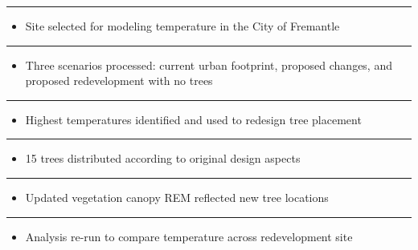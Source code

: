 \documentclass[
  letterpaper,
  DIV=11,
  numbers=noendperiod]{scrreprt}
\providecommand{\tightlist}{%
  \setlength{\itemsep}{0pt}\setlength{\parskip}{0pt}}\usepackage{longtable,booktabs,array}
\begin{document}
\begin{center}\rule{0.5\linewidth}{0.5pt}\end{center}

\begin{itemize}
\tightlist
\item
  Site selected for modeling temperature in the City of Fremantle
\end{itemize}

\begin{center}\rule{0.5\linewidth}{0.5pt}\end{center}

\begin{itemize}
\tightlist
\item
  Three scenarios processed: current urban footprint, proposed changes,
  and proposed redevelopment with no trees
\end{itemize}

\begin{center}\rule{0.5\linewidth}{0.5pt}\end{center}

\begin{itemize}
\tightlist
\item
  Highest temperatures identified and used to redesign tree placement
\end{itemize}

\begin{center}\rule{0.5\linewidth}{0.5pt}\end{center}

\begin{itemize}
\tightlist
\item
  15 trees distributed according to original design aspects
\end{itemize}

\begin{center}\rule{0.5\linewidth}{0.5pt}\end{center}

\begin{itemize}
\tightlist
\item
  Updated vegetation canopy REM reflected new tree locations
\end{itemize}

\begin{center}\rule{0.5\linewidth}{0.5pt}\end{center}

\begin{itemize}
\tightlist
\item
  Analysis re-run to compare temperature across redevelopment site
\end{itemize}
\end{document}
